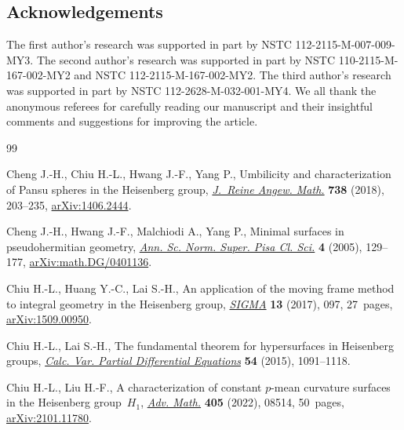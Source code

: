 \documentclass[10pt,a4paper]{amsart}
\numberwithin{equation}{section}
\begin{document}
\subsection*{Acknowledgements}

The first author's research was supported in part by NSTC 112-2115-M-007-009-MY3. The second author's research was supported in part by NSTC 110-2115-M-167-002-MY2 and NSTC 112-2115-M-167-002-MY2. The third author's research was supported in part by NSTC 112-2628-M-032-001-MY4. We all thank the anonymous referees for carefully reading our manuscript and their insightful comments and suggestions for improving the article.


\begin{thebibliography}{99}
\footnotesize\itemsep=0pt

Cheng J.-H., Chiu H.-L., Hwang J.-F., Yang P., Umbilicity and characterization of
 {P}ansu spheres in the {H}eisenberg group, \href{https://doi.org/10.1515/crelle-2015-0044}{\textit{J.~Reine Angew. Math.}}
 \textbf{738} (2018), 203--235, \href{https://arxiv.org/abs/1406.2444}{arXiv:1406.2444}.

Cheng J.-H., Hwang J.-F., Malchiodi A., Yang P., Minimal surfaces in
 pseudohermitian geometry, \href{http://www.numdam.org/item/ASNSP_2005_5_4_1_129_0/}{\textit{Ann. Sc. Norm. Super. Pisa Cl. Sci.}}
 \textbf{4} (2005), 129--177, \href{https://arxiv.org/abs/math.DG/0401136}{arXiv:math.DG/0401136}.

Chiu H.-L., Huang Y.-C., Lai S.-H., An application of the moving frame method to
 integral geometry in the {H}eisenberg group, \href{https://doi.org/10.3842/SIGMA.2017.097}{\textit{SIGMA}} \textbf{13}
 (2017), 097, 27~pages, \href{https://arxiv.org/abs/1509.00950}{arXiv:1509.00950}.

Chiu H.-L., Lai S.-H., The fundamental theorem for hypersurfaces in {H}eisenberg
 groups, \href{https://doi.org/10.1007/s00526-015-0818-1}{\textit{Calc. Var. Partial Differential Equations}} \textbf{54}
 (2015), 1091--1118.

Chiu H.-L., Liu H.-F., A characterization of constant {$p$}-mean curvature
 surfaces in the {H}eisenberg group~{$H_1$}, \href{https://doi.org/10.1016/j.aim.2022.108514}{\textit{Adv. Math.}} \textbf{405}
 (2022), 08514, 50~pages, \href{https://arxiv.org/abs/2101.11780}{arXiv:2101.11780}.


\end{thebibliography}
\end{document}
